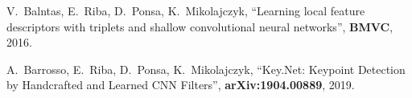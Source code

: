 V.~Balntas, E.~Riba, D.~Ponsa, K.~Mikolajczyk, ``Learning local feature descriptors with triplets and shallow convolutional neural networks'', \textbf{BMVC}, 2016.

A.~Barrosso, E.~Riba, D.~Ponsa, K.~Mikolajczyk, ``Key.Net: Keypoint Detection by Handcrafted and Learned CNN Filters'', \textbf{arXiv:1904.00889}, 2019.